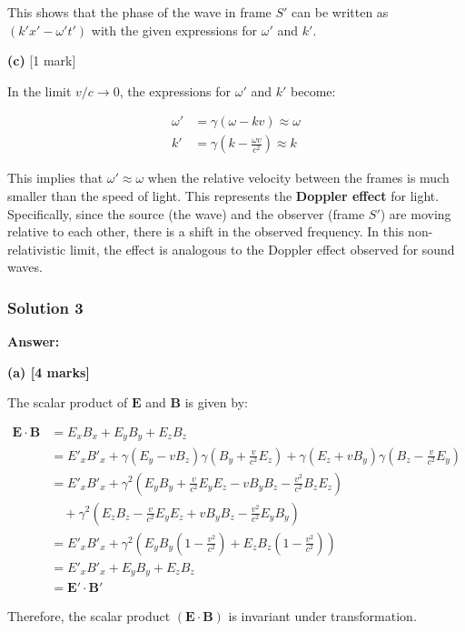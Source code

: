 \documentclass{article}
\begin{document}
This shows that the phase of the wave in frame $S'$ can be written as $(k'x' - \omega' t')$ with the given expressions for $\omega'$ and $k'$.

\textbf{(c)} [1 mark]

In the limit $v/c \to 0$, the expressions for $\omega'$ and $k'$ become:

\begin{align*}
\omega' &= \gamma (\omega - k v) \approx \omega  \\
k' &= \gamma \left( k - \frac{\omega v}{c^2} \right) \approx k
\end{align*}

This implies that $\omega' \approx \omega$ when the relative velocity between the frames is much smaller than the speed of light. This represents the \textbf{Doppler effect} for light. Specifically, since the source (the wave) and the observer (frame $S'$) are moving relative to each other, there is a shift in the observed frequency. In this non-relativistic limit, the effect is analogous to the Doppler effect observed for sound waves. 

\subsubsection{Solution 3}
\textbf{Answer:}

\textbf{(a) [4 marks]}

The scalar product of $\mathbf{E}$ and $\mathbf{B}$ is given by:

\begin{align*}
\mathbf{E} \cdot \mathbf{B} &= E_x B_x + E_y B_y + E_z B_z \\
&= E'_x B'_x + \gamma (E_y - v B_z) \gamma \left( B_y + \frac{v}{c^2} E_z \right) + \gamma (E_z + v B_y) \gamma \left( B_z - \frac{v}{c^2} E_y \right) \\
&= E'_x B'_x + \gamma^2 \left( E_y B_y + \frac{v}{c^2} E_y E_z - v B_y B_z - \frac{v^2}{c^2} B_z E_z \right) \\
&\quad + \gamma^2 \left( E_z B_z - \frac{v}{c^2} E_y E_z + v B_y B_z - \frac{v^2}{c^2} E_y B_y \right) \\
&= E'_x B'_x + \gamma^2 \left( E_y B_y \left( 1 - \frac{v^2}{c^2} \right) + E_z B_z \left( 1 - \frac{v^2}{c^2} \right) \right) \\
&= E'_x B'_x + E_y B_y + E_z B_z \\
&= \mathbf{E'} \cdot \mathbf{B'}
\end{align*}

Therefore, the scalar product $(\mathbf{E} \cdot \mathbf{B})$ is invariant under transformation.
\end{document}
